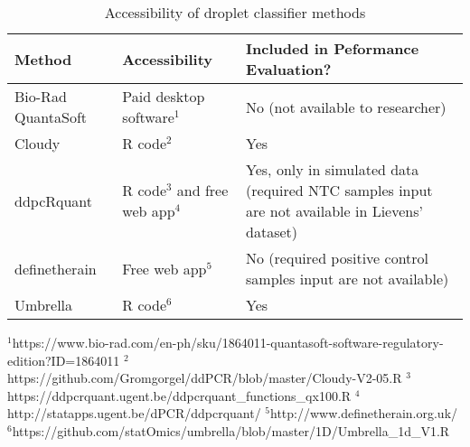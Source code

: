 \bgroup
\def\arraystretch{2}%
\begin{table}[]
    \caption{Accessibility of droplet classifier methods}
    \begin{tabularx}{\textwidth}{p{2.7cm}Xp{5.5cm}}
    \toprule
    \textbf{Method}    & \textbf{Accessibility}                 & \textbf{Included in Peformance Evaluation?} \\ 
    \midrule
    Bio-Rad QuantaSoft & Paid desktop software\(^1\)            & No \newline (not available to researcher)                                                         \\ 
    Cloudy             & R code\(^2\)                           & Yes \newline                                                                                                     \\ 
    ddpcRquant         & R code\(^3\) and free web app\(^4\)    & Yes, only in simulated data \newline (required NTC samples input are not available in Lievens’ dataset) \\ 
    definetherain      & Free web app\(^5\)                     & No \newline (required positive control samples input are not available)                                 \\ 
    Umbrella           & R code\(^6\)                           & Yes                                                                                                     \\ 
    \bottomrule
    \end{tabularx}
    {\scriptsize 
    \(^1\)https://www.bio-rad.com/en-ph/sku/1864011-quantasoft-software-regulatory-edition?ID=1864011 \newline
    \(^2\)https://github.com/Gromgorgel/ddPCR/blob/master/Cloudy-V2-05.R \newline
    \(^3\)https://ddpcrquant.ugent.be/ddpcrquant\_functions\_qx100.R \newline
    \(^4\)http://statapps.ugent.be/dPCR/ddpcrquant/\newline
    \(^5\)http://www.definetherain.org.uk/ \newline
    \(^6\)https://github.com/statOmics/umbrella/blob/master/1D/Umbrella\_1d\_V1.R
    }
    \label{tab:methodsaccessibility}
\end{table}
\egroup

